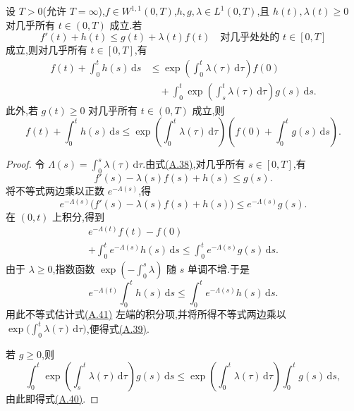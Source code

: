 \begin{lemma}\label{lem:appendix-a-55}
设 $T>0$(允许 $T=\infty$),$f\in W^{1,1}(0,T)$,$h,g,\lambda\in L^1(0,T)$,且 $h(t),\lambda(t)\ge0$ 对几乎所有 $t\in(0,T)$ 成立.若
\begin{equation}\label{eq:appendix-a-38}
 f'(t)+h(t)\le g(t)+\lambda(t)f(t)
 \quad\text{对几乎处处的 }t\in[0,T]
\end{equation}
成立,则对几乎所有 $t\in[0,T]$,有
\begin{equation}\label{eq:appendix-a-39}
\begin{aligned}
 f(t)+\int_0^t h(s)\,\mathrm ds
 &\le \exp\left(\int_0^t\lambda(\tau)\,\mathrm d\tau\right)f(0)\\
 &\quad+\int_0^t\exp\left(\int_s^t\lambda(\tau)\,\mathrm d\tau\right)g(s)\,\mathrm ds.
\end{aligned}
\end{equation}
此外,若 $g(t)\ge0$ 对几乎所有 $t\in(0,T)$ 成立,则
\begin{equation}\label{eq:appendix-a-40}
 f(t)+\int_0^t h(s)\,\mathrm ds
 \le \exp\left(\int_0^t\lambda(\tau)\,\mathrm d\tau\right)
 \left(f(0)+\int_0^t g(s)\,\mathrm ds\right).
\end{equation}
\end{lemma}
\begin{proof}
令 $\Lambda(s)=\int_0^s\lambda(\tau)\,\mathrm d\tau$.由式\hyperref[eq:appendix-a-38]{(A.38)},对几乎所有 $s\in[0,T]$,有
\[
 f'(s)-\lambda(s)f(s)+h(s)\le g(s).
\]
将不等式两边乘以正数 $e^{-\Lambda(s)}$,得
\[
 e^{-\Lambda(s)}\bigl(f'(s)-\lambda(s)f(s)+h(s)\bigr)
 \le e^{-\Lambda(s)}g(s).
\]
在 $(0,t)$ 上积分,得到
\begin{equation}\label{eq:appendix-a-41}
\begin{split}
 e^{-\Lambda(t)}f(t)-f(0)\\
 +\int_0^t e^{-\Lambda(s)}h(s)\,\mathrm ds
 \le\int_0^t e^{-\Lambda(s)}g(s)\,\mathrm ds.
\end{split}
\end{equation}
由于 $\lambda\ge0$,指数函数 $\exp(-\int_0^s\lambda)$ 随 $s$ 单调不增.于是
\[
 e^{-\Lambda(t)}\int_0^t h(s)\,\mathrm ds
 \le\int_0^t e^{-\Lambda(s)}h(s)\,\mathrm ds.
\]
用此不等式估计式\hyperref[eq:appendix-a-41]{(A.41)} 左端的积分项,并将所得不等式两边乘以 $\exp\bigl(\int_0^t\lambda(\tau)\,\mathrm d\tau\bigr)$,便得式\hyperref[eq:appendix-a-39]{(A.39)}.

若 $g\ge0$,则
\[
 \int_0^t\exp\left(\int_s^t\lambda(\tau)\,\mathrm d\tau\right)g(s)\,\mathrm ds
 \le \exp\left(\int_0^t\lambda(\tau)\,\mathrm d\tau\right)\int_0^t g(s)\,\mathrm ds,
\]
由此即得式\hyperref[eq:appendix-a-40]{(A.40)}.
\end{proof}

